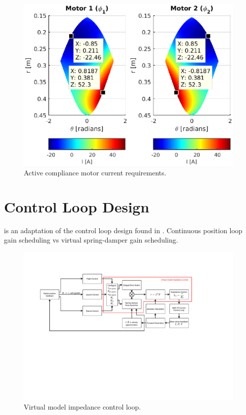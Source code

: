\begin{figure}
\centering
\includegraphics[width=1\textwidth]{images/control/forward-kinematic-motor-current.eps} 
\caption{Active compliance motor current requirements.}
\label{fig:motor-current-requirements}
\end{figure}

\section{Control Loop Design}
 is an adaptation of the control loop design found in \cite{Kalouche2016}. Continuous position loop gain scheduling vs virtual spring-damper gain scheduling.

\begin{figure}
\centering
\includegraphics[clip, trim=2cm 8cm 5cm 3cm, page = 1, width=1\textwidth]{images/control/virtual-model-impedance.pdf} 
\caption{Virtual model impedance control loop.}
\label{fig:virtual-model-impedance-loop}
\end{figure}

